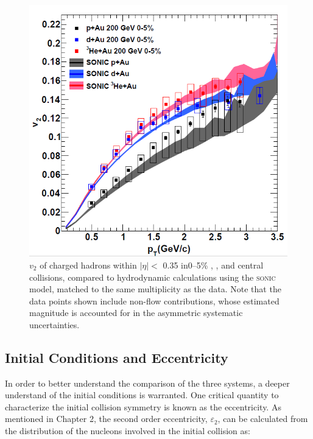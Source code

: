 
\begin{figure}[!ht]
\begin{center}
\includegraphics[width=0.65\linewidth]{figs/three_system_comparison_result.png}
\caption{$v_2$ of charged hadrons within $|\eta| <$ 0.35 in0--5\% \pau, \dau, and \hau central collisions, compared to hydrodynamic calculations using the \textsc{sonic} model, matched to the same multiplicity as the data. Note that the data points shown include non-flow contributions, whose estimated magnitude is accounted for in the asymmetric systematic uncertainties.}
\label{fig:all_system_hydro}
\end{center}
\end{figure}

\subsection{Initial Conditions and Eccentricity}
In order to better understand the comparison of the three systems, a deeper understand of the initial conditions is warranted. One critical quantity to characterize the initial collision symmetry is known as the eccentricity. As mentioned in Chapter 2, the second order eccentricity, $\varepsilon_2$, can be calculated from the distribution of the nucleons involved in the initial collision as:

